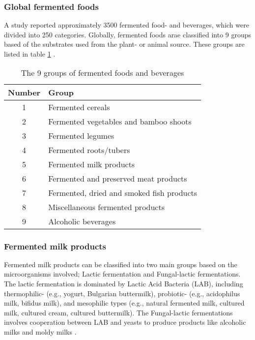 \subsubsection*{Global fermented foods}
A study reported approximately 3500 fermented food- and beverages, which were divided into 250 categories. Globally, fermented foods arae classified into 9 groups based of the substrates used from the plant- or animal source. These groups are listed in table \ref*{tab:Major_groups} \cite*{L1-DiversityMicro}.

\begin{table}[h]
    \centering
    \caption{The 9 groups of fermented foods and beverages}
    \label{tab:Major_groups}
    \begin{tabular}{c|>{\centering\arraybackslash}m{}}
        \textbf{Number} & \textbf{Group} \\
        \hline
        1 & Fermented cereals \\
        2 & Fermented vegetables and bamboo shoots \\
        3 & Fermented legumes \\
        4 & Fermented roots/tubers \\
        5 & Fermented milk products \\
        6 & Fermented and preserved meat products \\
        7 & Fermented, dried and smoked fish products \\
        8 & Miscellaneous fermented products \\
        9 & Alcoholic beverages \\
    \end{tabular}
\end{table}

\subsubsection*{Fermented milk products}
Fermented milk products can be classified into two main groups based on the microorganisms involved; Lactic fermentation and Fungal-lactic fermentations. The lactic fermentation is dominated by Lactic Acid Bacteria (LAB), including thermophilic- (e.g., yogurt, Bulgarian buttermilk), probiotic-  (e.g., acidophilus milk, bifidus milk), and mesophilic types  (e.g., natural fermented milk, cultured milk, cultured cream, cultured buttermilk). The Fungal-lactic fermentations involves cooperation between LAB and yeasts to produce products like alcoholic milks and moldy milks \cite*{L1-DiversityMicro}.

